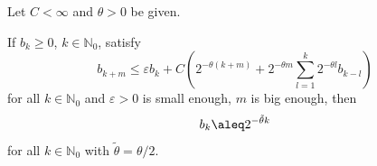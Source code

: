 \begin{lemma} \label{lem:IterationLemma}
 Let $C<\infty$ and $\theta >0 $ be given.

 If $b_k\geq 0$, $k \in \mathbb N_0$, satisfy
 \begin{equation} \label{eq:Iteration}
  b_{k+m} \leq \varepsilon b_{k} +
    C\left(2^{-\theta (k+m)} + 2^{-\theta m}\sum_{l=1}^k 2^{-\theta l} b_{k-l}\right)  
 \end{equation}
 for all $k \in \mathbb N_0$ and $\varepsilon>0$ is small enough, $m$ is 
 big enough, then
 \begin{equation*}
  b_k \aleq 2^{-\tilde \theta k} 
 \end{equation*}
 for all $k\in \mathbb N_0$ with $\tilde \theta = \theta /2$.
\end{lemma}

